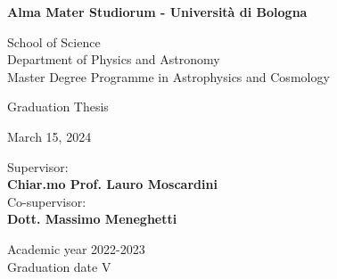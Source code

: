 \thispagestyle{empty}

\begin{center}
    \fontsize{18pt}{18pt}\selectfont
    \textbf{Alma Mater Studiorum - Università di Bologna}
    \par\noindent\hrulefill\vspace{2.5mm}

    \Large{School of Science \\ Department of Physics and Astronomy \\ Master Degree Programme in Astrophysics and Cosmology}

    \vspace{70mm}


    \vspace{5mm}

    Graduation Thesis

    \vspace{5mm}

    March 15, 2024

    \vfill

    \begin{minipage}[t]{0.34\textwidth}
        \begin{flushleft}
            {}
        \end{flushleft}
    \end{minipage}
    \begin{minipage}[t]{0.64\textwidth}
        \begin{flushright}
            {\fontsize{16pt}{16pt} {Supervisor: \\ \vspace{1mm} \textbf{Chiar.mo Prof. Lauro Moscardini}}} \\
            \vspace{5mm}
            {\fontsize{16pt}{16pt} {Co-supervisor: \\ \vspace{1mm} \textbf{Dott. Massimo Meneghetti}}}
        \end{flushright}
    \end{minipage}

    \vspace{10mm}\noindent\hrulefill\vspace{3mm}

    \Large{Academic year 2022-2023 \\ Graduation date V}
\end{center}
\restoregeometry